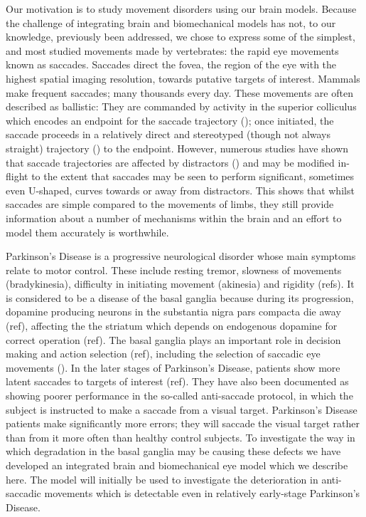 \documentclass{frontiersSCNS}
\begin{document}
Our motivation is to study movement disorders using our brain
models. Because the challenge of integrating brain and biomechanical
models has not, to our knowledge, previously been addressed, we chose
to express some of the simplest, and most studied movements made by
vertebrates: the rapid eye movements known as saccades. Saccades
direct the fovea, the region of the eye with the highest spatial
imaging resolution, towards putative targets of interest. Mammals make
frequent saccades; many thousands every day. These movements are often
described as ballistic: They are commanded by activity in the superior
colliculus which encodes an endpoint for the saccade trajectory
(); once initiated, the
saccade proceeds in a relatively direct and stereotyped (though not
always straight) trajectory () to
the endpoint.
However, numerous studies have shown that saccade trajectories are
affected by distractors () and may be
modified in-flight to the extent that saccades may be seen to perform
significant, sometimes even U-shaped, curves towards or away from
distractors. This shows that whilst saccades are simple compared to
the movements of limbs, they still provide information about a number
of mechanisms within the brain and an effort to model them accurately
is worthwhile.

Parkinson's Disease is a progressive neurological disorder whose main
symptoms relate to motor control. These include resting tremor,
slowness of movements (bradykinesia), difficulty in initiating
movement (akinesia) and rigidity (refs). It is considered to be a
disease of the basal ganglia because during its progression, dopamine
producing neurons in the substantia nigra pars compacta die away
(ref), affecting the the striatum which depends on endogenous dopamine
for correct operation (ref). The basal ganglia plays an important role
in decision making and action selection (ref), including the selection
of saccadic eye movements (). In the later
stages of Parkinson's Disease, patients show more latent saccades to
targets of interest (ref). They have also been documented as showing
poorer performance in the so-called anti-saccade protocol, in which
the subject is instructed to make a saccade  from a visual
target. Parkinson's Disease patients make significantly more errors;
they will saccade  the visual target rather than  from
it more often than healthy control subjects. To investigate the way in
which degradation in the basal ganglia may be causing these defects we
have developed an integrated brain and biomechanical eye model which
we describe here. The model will initially be used to investigate the
deterioration in anti-saccadic movements which is detectable even in
relatively early-stage Parkinson's Disease.
\end{document}
